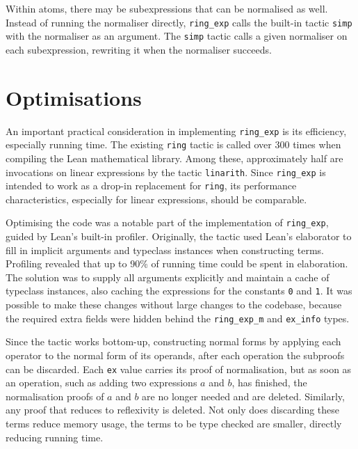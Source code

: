 \documentclass{llncs}
\newcommand{\lean}[1]{\texttt{#1}\xspace} %
\newcommand{\ring}{\lean{ring}}
\newcommand{\ringexp}{\lean{ring\_exp}}
\begin{document}
Within atoms, there may be subexpressions that can be normalised as well.
Instead of running the normaliser directly, \ringexp calls the built-in tactic \lean{simp} with the normaliser as an argument.
The \lean{simp} tactic calls a given normaliser on each subexpression,
rewriting it when the normaliser succeeds.

\section{Optimisations}

An important practical consideration in implementing \ringexp is its efficiency, especially running time.
The existing \lean{ring} tactic is called over 300 times when compiling the Lean mathematical library.
Among these, approximately half are invocations on linear expressions by the tactic \lean{linarith}.
Since \ringexp is intended to work as a drop-in replacement for \lean{ring},
its performance characteristics, especially for linear expressions, should be comparable.

Optimising the code was a notable part of the implementation of \ringexp,
guided by Lean's built-in profiler.
Originally, the tactic used Lean's elaborator to fill in implicit arguments and typeclass instances when constructing terms.
Profiling revealed that up to 90\% of running time could be spent in elaboration.
The solution was to supply all arguments explicitly and maintain a cache of typeclass instances,
also caching the expressions for the constants \lean{0} and \lean{1}.
It was possible to make these changes without large changes to the codebase,
because the required extra fields were hidden behind the \lean{ring\_exp\_m} and \lean{ex\_info} types.

Since the tactic works bottom-up,
constructing normal forms by applying each operator to the normal form of its operands,
after each operation the subproofs can be discarded.
Each \lean{ex} value carries its proof of normalisation,
but as soon as an operation, such as adding two expressions $a$ and $b$, has finished,
the normalisation proofs of $a$ and $b$ are no longer needed and are deleted.
Similarly, any proof that reduces to reflexivity is deleted.
Not only does discarding these terms reduce memory usage,
the terms to be type checked are smaller, directly reducing running time.

\end{document}
